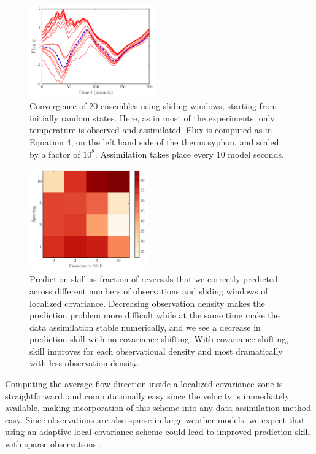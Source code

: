 \begin{figure}[h]
  \centering
  \includegraphics[width=0.48\textwidth]{../figures/2015-10-12-09-36-loop-spaghetti.pdf}
  \caption[]{
    Convergence of 20 ensembles using sliding windows, starting from initially random states.
    Here, as in most of the experiments, only temperature is observed and assimilated.
    Flux is computed as in Equation 4, on the left hand side of the thermosyphon, and scaled by a factor of $10^8$.
    Assimilation takes place every 10 model seconds.
  }
  \label{fig:sliding_spag}
\end{figure}

\begin{figure}[h]
  \centering
  \includegraphics[width=0.45\textwidth]{../figures/2015-09-30-19-59-consuela-2.pdf}
  \caption[]{
    Prediction skill as fraction of reversals that we correctly predicted across different numbers of observations and sliding windows of localized covariance.
    Decreasing observation density makes the prediction problem more difficult while at the same time make the data assimilation stable numerically, and we see a decrease in prediction skill with no covariance shifting.
    With covariance shifting, skill improves for each observational density and most dramatically with less observation density.
  }
  \label{fig:sliding_results}
\end{figure}

Computing the average flow direction inside a localized covariance zone is straightforward, and computationally easy since the velocity is immediately available, making incorporation of this scheme into any data assimilation method easy.
Since observations are also sparse in large weather models, we expect that using an adaptive local covariance scheme could lead to improved prediction skill with sparse observations \cite{bishop2011a}.

